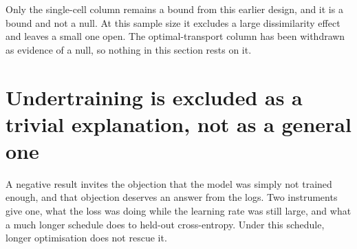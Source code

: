 \begin{scopelimit}
Only the single-cell column remains a bound from this earlier design, and it is
a bound and not a null. At this sample size it excludes a large dissimilarity
effect and leaves a small one open. The optimal-transport column has been
withdrawn as evidence of a null, so nothing in this section rests on it.
\end{scopelimit}

\framedecl{-}
\section{Undertraining is excluded as a trivial explanation, not as a general one}
\label{sec:app-training}

\begin{question}
A negative result invites the objection that the model was simply not trained
enough, and that objection deserves an answer from the logs. Two instruments
give one, what the loss was doing while the learning rate was still large, and
what a much longer schedule does to held-out cross-entropy. Under this schedule,
longer optimisation does not rescue it.
\end{question}

